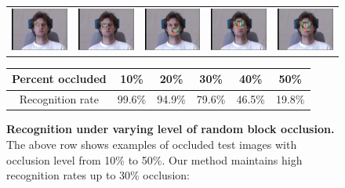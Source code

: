 \documentclass[10pt,journal,letterpaper,compsoc]{IEEEtran}
\begin{document}
\newcommand{\tempscale}{0.40}
\begin{figure}
\centering
\begin{tabular}{@{}c@{}c@{}c@{}c@{}c@{}}
\includegraphics[scale=\tempscale,clip=true]{figures_pami/multipie_occ/occ10.png} &
\includegraphics[scale=\tempscale,clip=true]{figures_pami/multipie_occ/occ20.png} &
\includegraphics[scale=\tempscale,clip=true]{figures_pami/multipie_occ/occ30.png} &
\includegraphics[scale=\tempscale,clip=true]{figures_pami/multipie_occ/occ40.png} &
\includegraphics[scale=\tempscale,clip=true]{figures_pami/multipie_occ/occ50.png}  \\
\end{tabular}
\vspace{-1mm}
\caption{{\bf Recognition under varying level of
random block occlusion.} The above row shows examples of occluded test images with occlusion level from 10\% to 50\%. Our method maintains high recognition rates up to 30\% occlusion:}
\vspace{2mm}
{\small
\begin{tabular}{|c|c|c|c|c|c| }
\hline
Percent occluded & 10\% & 20\% & 30\% & 40\% & 50\%  \\
\hline
Recognition rate & 99.6\% & 94.9\% & 79.6\% & 46.5\% & 19.8\% \\
\hline
\end{tabular}
}
\label{fig:multipie-occ-rec}
\vspace{-.3in}
\end{figure}
\end{document}

